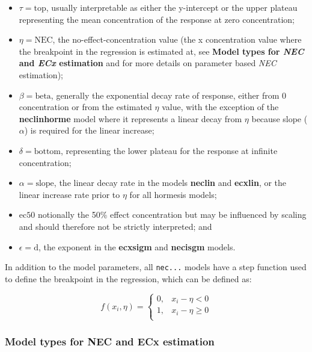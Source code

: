\documentclass[
]{jss}
\begin{document}
\begin{itemize}
\item
  \(\tau = \text{top}\), usually interpretable as either the y-intercept
  or the upper plateau representing the mean concentration of the
  response at zero concentration;
\item
  \(\eta = \text{NEC}\), the no-effect-concentration value (the x
  concentration value where the breakpoint in the regression is
  estimated at, see \textbf{Model types for \emph{NEC} and \emph{ECx}
  estimation} and \citep{Fox2010} for more details on parameter based
  \emph{NEC} estimation);
\item
  \(\beta = \text{beta}\), generally the exponential decay rate of
  response, either from 0 concentration or from the estimated \(\eta\)
  value, with the exception of the \textbf{neclinhorme} model where it
  represents a linear decay from \(\eta\) because slope (\(\alpha\)) is
  required for the linear increase;
\item
  \(\delta = \text{bottom}\), representing the lower plateau for the
  response at infinite concentration;
\item
  \(\alpha = \text{slope}\), the linear decay rate in the models
  \textbf{neclin} and \textbf{ecxlin}, or the linear increase rate prior
  to \(\eta\) for all hormesis models;
\item
  \(\text{ec50}\) notionally the 50\% effect concentration but may be
  influenced by scaling and should therefore not be strictly
  interpreted; and
\item
  \(\epsilon = \text{d}\), the exponent in the \textbf{ecxsigm} and
  \textbf{necisgm} models.
\end{itemize}

In addition to the model parameters, all \texttt{nec...} models have a
step function used to define the breakpoint in the regression, which can
be defined as:

\[
f(x_i, \eta) = \begin{cases} 
      0, & x_i - \eta < 0 \\
      1, & x_i - \eta \geq 0 \\
   \end{cases}
\]

\hypertarget{model-types-for-nec-and-ecx-estimation}{%
\subsubsection{Model types for NEC and ECx
estimation}\label{model-types-for-nec-and-ecx-estimation}}
\end{document}
